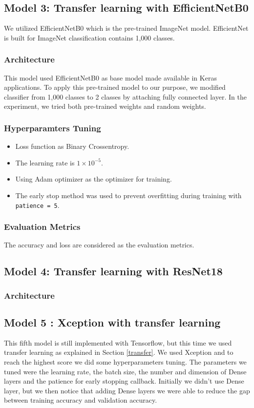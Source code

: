 \documentclass[conference]{IEEEtran}
\begin{document}
\subsection{Model 3: Transfer learning with EfficientNetB0}
We utilized EfficientNetB0\cite{DBLP:journals/corr/abs-1905-11946}  which is the pre-trained ImageNet model. EfficientNet is built for ImageNet classification contains 1,000 classes.
\subsubsection{Architecture}
This model used EfficientNetB0 as base model made available in Keras applications. To apply this pre-trained model to our purpose, we modified classifier from 1,000 classes to 2 classes by attaching fully connected layer. In the experiment, we tried both pre-trained weights and random weights.

\subsubsection{Hyperparamters Tuning}
\begin{itemize}
    \item Loss function as Binary Crossentropy.
    \item The learning rate is $1\times10^{-5}$.
    \item Using Adam optimizer as the optimizer for training. 
    \item The early stop method was used to prevent overfitting during training with \texttt{patience = 5}.
\end{itemize}

\subsubsection{Evaluation Metrics}
The accuracy and loss are considered as the evaluation metrics.


\subsection{Model 4: Transfer learning with ResNet18}
\subsubsection{Architecture}

\subsection{Model 5 : Xception with transfer learning}
This fifth model is still implemented with Tensorflow, but this time we used transfer learning as explained in Section \ref{transfer}.
We used Xception and to reach the highest score we did some hyperparameters tuning. The parameters we tuned were the learning rate, the batch size, the number and dimension of Dense layers and the patience for early stopping callback.
Initially we didn't use Dense layer, but we then notice that adding Dense layers we were able to reduce the gap between training accuracy and validation accuracy.
\end{document}
